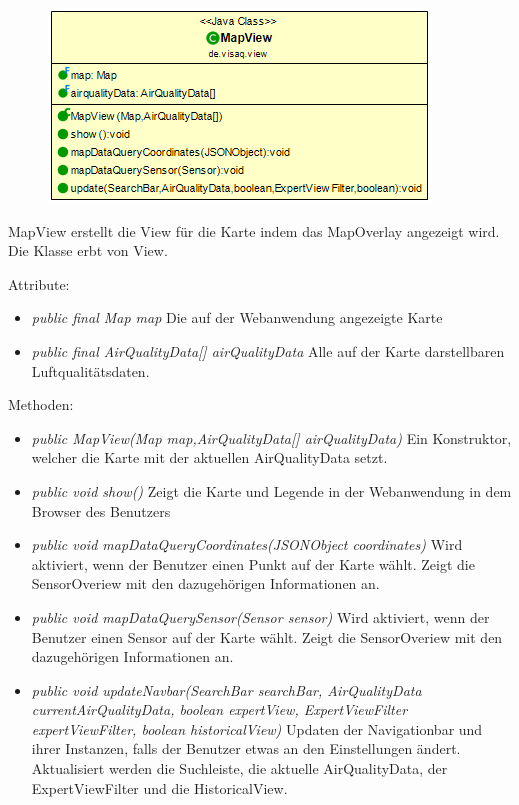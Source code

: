 \begin{minipage}{0.4\textwidth}
    \begin{figure}[H]
        \includegraphics[scale = 0.5]{media/frontend/view/de.view/MapView_Class.png}
    \end{figure}
\end{minipage} \hfill
\begin{minipage}{0.5\textwidth}
    MapView erstellt die View für die Karte indem das MapOverlay angezeigt wird. Die Klasse erbt von View.
\end{minipage}

Attribute:
\begin{itemize}
    \item \emph{public final Map map} Die auf der Webanwendung angezeigte Karte
    \item \emph{public final AirQualityData[] airQualityData} Alle auf der Karte darstellbaren Luftqualitätsdaten.
\end{itemize}
Methoden:
\begin{itemize}
    \item \emph{public MapView(Map map,AirQualityData[] airQualityData)} Ein Konstruktor, welcher die Karte mit der aktuellen AirQualityData setzt.
    \item \emph{public void show()} Zeigt die Karte und Legende in der Webanwendung in dem Browser des Benutzers
    \item \emph{public void mapDataQueryCoordinates(JSONObject coordinates)} Wird aktiviert, wenn der Benutzer einen Punkt auf der Karte wählt. Zeigt die SensorOveriew mit den dazugehörigen Informationen an.
    \item \emph{public void mapDataQuerySensor(Sensor sensor)} Wird aktiviert, wenn der Benutzer einen Sensor auf der Karte wählt. Zeigt die SensorOveriew mit den dazugehörigen Informationen an.
    \item \emph{public void updateNavbar(SearchBar searchBar, AirQualityData currentAirQualityData,
              boolean expertView, ExpertViewFilter expertViewFilter, boolean historicalView)} Updaten der Navigationbar und ihrer Instanzen, falls der Benutzer etwas an den Einstellungen ändert. Aktualisiert werden die Suchleiste, die aktuelle AirQualityData, der ExpertViewFilter und die HistoricalView.
\end{itemize}

